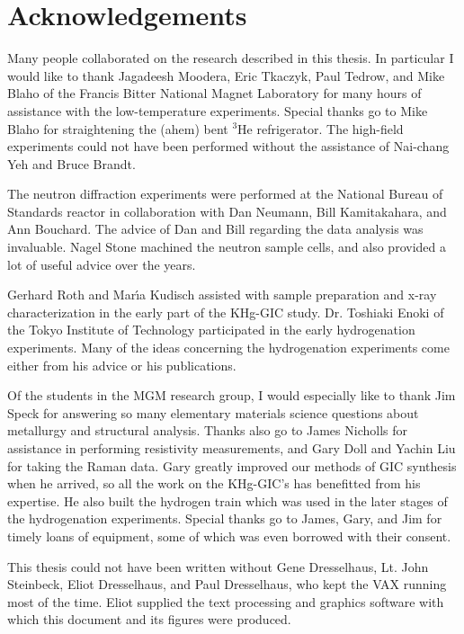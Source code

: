 \section*{Acknowledgements}
\label{acknowledge}

        Many people collaborated on the research described  in this thesis.
In particular I would like  to thank Jagadeesh Moodera, Eric  Tkaczyk, Paul
Tedrow, and Mike Blaho of the Francis Bitter National Magnet Laboratory for
many hours of  assistance  with the   low-temperature experiments.  Special
thanks     go to Mike   Blaho for    straightening  the  (ahem) bent $^3$He
refrigerator.   The high-field experiments could   not have been  performed
without the assistance of  Nai-chang Yeh and Bruce Brandt.

        The neutron diffraction experiments were  performed at the National
Bureau of  Standards  reactor  in   collaboration with  Dan  Neumann,  Bill
Kamitakahara, and Ann Bouchard.   The advice of  Dan and Bill regarding the
data analysis   was invaluable.   Nagel Stone  machined  the neutron sample
cells, and also provided a lot of useful advice over the years.

        Gerhard  Roth   and   Mar\'{\i}a    Kudisch assisted  with   sample
preparation  and x-ray characterization  in the early  part of the  KHg-GIC
study.    Dr.   Toshiaki Enoki   of the    Tokyo  Institute of   Technology
participated  in the  early hydrogenation experiments.   Many  of the ideas
concerning the hydrogenation experiments come either from his advice or his
publications.

      Of the students in the MGM research group, I would especially like to
thank  Jim Speck for   answering  so   many  elementary  materials  science
questions  about  metallurgy and  structural analysis.   Thanks  also go to
James Nicholls  for assistance in performing  resistivity measurements, and
Gary Doll and Yachin Liu for taking the Raman  data.  Gary greatly improved
our methods  of GIC  synthesis when  he  arrived, so all  the  work on  the
KHg-GIC's has  benefitted from  his expertise.  He  also built the hydrogen
train which was used in the later stages  of the hydrogenation experiments.
Special thanks go to James, Gary, and Jim  for  timely loans  of equipment,
some of which was even borrowed with their consent.

        This thesis could  not have been written without  Gene Dresselhaus,
Lt. John Steinbeck, Eliot Dresselhaus, and  Paul Dresselhaus, who  kept the
VAX running  most  of the  time.   Eliot supplied  the text processing  and
graphics software with which this document and its figures were produced.

